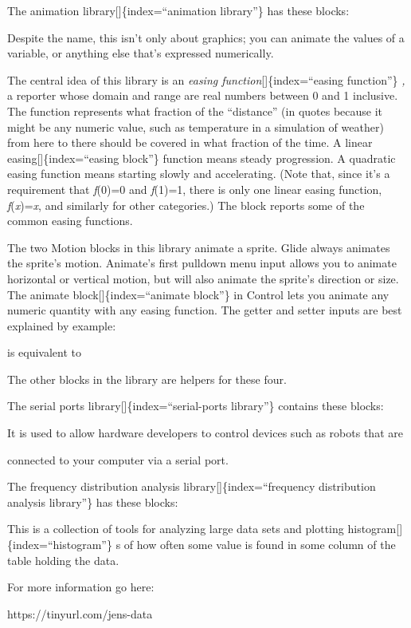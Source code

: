 \documentclass[
  letterpaper,
]{book}
\begin{document}
The animation library{[}{]}\{index=``animation library''\} has these
blocks:

Despite the name, this isn't only about graphics; you can animate the
values of a variable, or anything else that's expressed numerically.

The central idea of this library is an \emph{easing
function}{[}{]}\{index=``easing function''\} \emph{,} a reporter whose
domain and range are real numbers between 0 and 1 inclusive. The
function represents what fraction of the ``distance'' (in quotes because
it might be any numeric value, such as temperature in a simulation of
weather) from here to there should be covered in what fraction of the
time. A linear easing{[}{]}\{index=``easing block''\} function means
steady progression. A quadratic easing function means starting slowly
and accelerating. (Note that, since it's a requirement that
\emph{f}(0)=0 and \emph{f}(1)=1, there is only one linear easing
function, \emph{f}(\emph{x})=\emph{x}, and similarly for other
categories.) The block reports some of the common easing functions.

The two Motion blocks in this library animate a sprite. Glide always
animates the sprite's motion. Animate's first pulldown menu input allows
you to animate horizontal or vertical motion, but will also animate the
sprite's direction or size. The animate block{[}{]}\{index=``animate
block''\} in Control lets you animate any numeric quantity with any
easing function. The getter and setter inputs are best explained by
example:

is equivalent to

The other blocks in the library are helpers for these four.

The serial ports library{[}{]}\{index=``serial-ports library''\}
contains these blocks:

It is used to allow hardware developers to control devices such as
robots that are

connected to your computer via a serial port.

The frequency distribution analysis library{[}{]}\{index=``frequency
distribution analysis library''\} has these blocks:

This is a collection of tools for analyzing large data sets and plotting
histogram{[}{]}\{index=``histogram''\} s of how often some value is
found in some column of the table holding the data.

For more information go here:

https://tinyurl.com/jens-data
\end{document}
